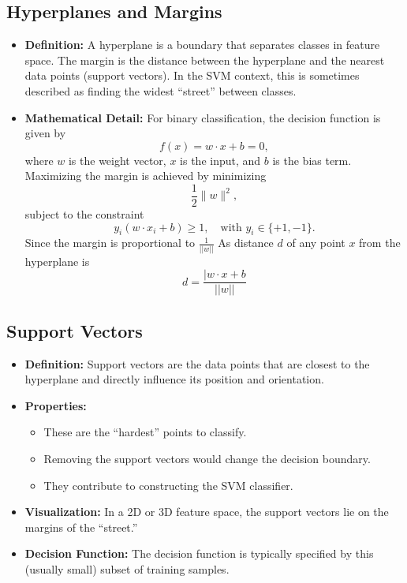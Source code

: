 \documentclass[10pt]{article}
\begin{document}
\subsection{Hyperplanes and Margins}
\begin{itemize}
    \item \textbf{Definition:} A hyperplane is a boundary that separates classes in feature space. The margin is the distance between the hyperplane and the nearest data points (support vectors). In the SVM context, this is sometimes described as finding the widest “street” between classes.
    \item \textbf{Mathematical Detail:} For binary classification, the decision function is given by
    \[
    f(x) = w \cdot x + b = 0,
    \]
    where \(w\) is the weight vector, \(x\) is the input, and \(b\) is the bias term. Maximizing the margin is achieved by minimizing
    \[
    \frac{1}{2}\|w\|^2,
    \]
    subject to the constraint
    \[
    y_i (w \cdot x_i + b) \geq 1, \quad \text{with } y_i \in \{+1, -1\}.
    \]
    Since the margin is proportional to $\frac{1}{||w||}$
    As distance $d$ of any point $x$ from the hyperplane is
    \[
    d=\frac{|w \cdot x + b}{||w||}
    \]
\end{itemize}

\subsection{Support Vectors}
\begin{itemize}
    \item \textbf{Definition:} Support vectors are the data points that are closest to the hyperplane and directly influence its position and orientation.
    \item \textbf{Properties:}
    \begin{itemize}
        \item These are the “hardest” points to classify.
        \item Removing the support vectors would change the decision boundary.
        \item They contribute to constructing the SVM classifier.
    \end{itemize}
    \item \textbf{Visualization:} In a 2D or 3D feature space, the support vectors lie on the margins of the “street.”
    \item \textbf{Decision Function:} The decision function is typically specified by this (usually small) subset of training samples.
\end{itemize}
\end{document}
